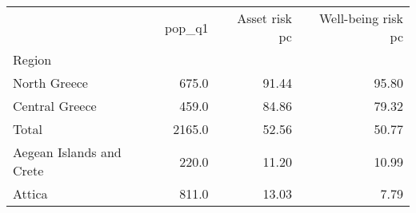 \begin{tabular}{lrrr}
\toprule
{} &  pop\_q1 &  Asset risk pc &  Well-being risk pc \\
Region                   &         &                &                     \\
\midrule
North Greece             &   675.0 &          91.44 &               95.80 \\
Central Greece           &   459.0 &          84.86 &               79.32 \\
Total                    &  2165.0 &          52.56 &               50.77 \\
Aegean Islands and Crete &   220.0 &          11.20 &               10.99 \\
Attica                   &   811.0 &          13.03 &                7.79 \\
\bottomrule
\end{tabular}
